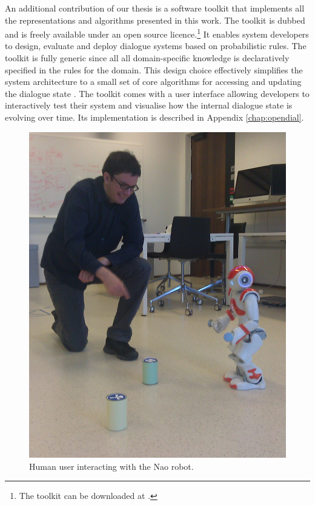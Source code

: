 An additional contribution of our thesis is a software toolkit that implements all the representations and algorithms presented in this work. The toolkit is dubbed \opendial  and is freely available under an open source licence.\footnote{The toolkit can be downloaded at .} It enables system developers to design, evaluate and deploy dialogue systems based on probabilistic rules. 
The toolkit is fully generic since all all domain-specific knowledge is declaratively specified in the rules for the domain.  This design choice effectively simplifies the system architecture to a small set of core algorithms for accessing and updating the dialogue state \citep{lison-semdial2012}. The \opendial  toolkit comes with a user interface allowing developers to interactively test their system and visualise how the internal dialogue state is evolving over time.  Its implementation is described in Appendix \ref{chap:opendial}. 

\begin{figure}
\vspace{-6mm}
\begin{center}
\includegraphics[scale=0.10]{imgs/nao1.jpg}
\end{center} 
\caption{Human user interacting with the Nao robot.}
\label{fig:nao}
\end{figure}

